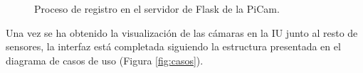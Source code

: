 \begin{figure}[h!]
\begin{center}
    \hspace{2mm}
  \end{center}
\caption{Proceso de registro en el servidor de Flask de la PiCam.} \label{fig:proceso}
\end{figure}

Una vez se ha obtenido la visualización de las cámaras en la IU junto al resto de sensores, la interfaz está completada siguiendo la estructura presentada en el diagrama de casos de uso (Figura \ref{fig:casos}).



